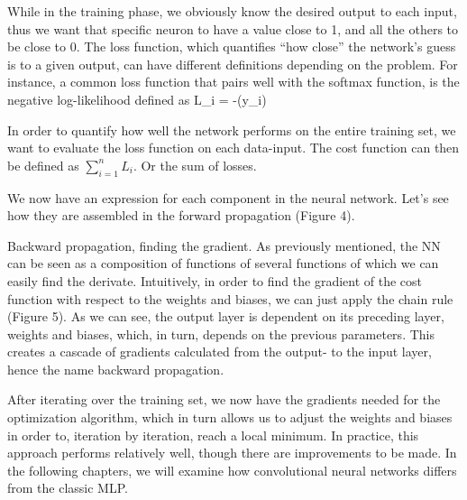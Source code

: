 While in the training phase, we obviously know the desired output to each input, thus we want that specific neuron to have a value close to 1, and all the others to be close to 0. 
The loss function, which quantifies “how close” the network’s guess is to a given output, can have different definitions depending on the problem.
For instance, a common loss function that pairs well with the softmax function, is the negative log-likelihood defined as
\startformula
L_i = -\log(y_i)
\stopformula 

In order to quantify how well the network performs on the entire training set, we want to evaluate the loss function on each data-input. 
The cost function can then be defined as $\sum_{i=1}^n L_i$. Or the sum of losses. 
\stopsubsection

\startsubsection[title=Forward propagation]
We now have an expression for each component in the neural network.
Let’s see how they are assembled in the forward propagation (Figure 4).
\stopsubsection
 
\startsubsection[title=Backward propogation]
Backward propagation, finding the gradient. 
As previously mentioned, the NN can be seen as a composition of functions of several functions of which we can easily find the derivate.
Intuitively, in order to find the gradient of the cost function with respect to the weights and biases, we can just apply the chain rule (Figure 5).
As we can see, the output layer is dependent on its preceding layer, weights and biases, which, in turn, depends on the previous parameters.
This creates a cascade of gradients calculated from the output- to the input layer, hence the name backward propagation.  

After iterating over the training set, we now have the gradients needed for the optimization algorithm, which in turn allows us to adjust the weights and biases in order to, iteration by iteration, reach a local minimum.
In practice, this approach performs relatively well, though there are improvements to be made.
In the following chapters, we will examine how convolutional neural networks differs from the classic MLP. 
\stopsubsection
\stopsection